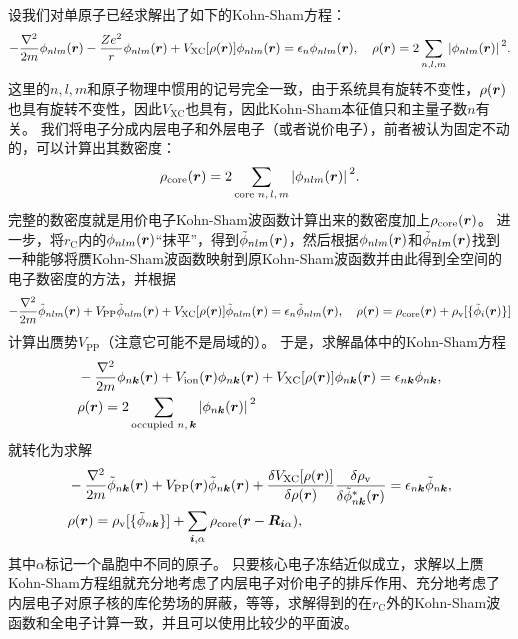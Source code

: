 设我们对单原子已经求解出了如下的Kohn-Sham方程：
\begin{equation}
    - \frac{\laplacian}{2m} \phi_{nlm}(\vb*{r}) - \frac{Z e^2}{r} \phi_{nlm}(\vb*{r}) + V_\text{XC}[\rho(\vb*{r})] \phi_{nlm}(\vb*{r}) = \epsilon_{n} \phi_{nlm}(\vb*{r}), \quad \rho(\vb*{r}) = 2 \sum_{n, l, m} \abs*{\phi_{nlm}(\vb*{r})}^2.
\end{equation}
这里的$n, l, m$和原子物理中惯用的记号完全一致，由于系统具有旋转不变性，$\rho(\vb*{r})$也具有旋转不变性，因此$V_\text{XC}$也具有，因此Kohn-Sham本征值只和主量子数$n$有关。
我们将电子分成内层电子和外层电子（或者说价电子），前者被认为固定不动的，可以计算出其数密度：
\begin{equation}
    \rho_\text{core}(\vb*{r}) = 2 \sum_{\text{core $n, l, m$}} \abs*{\phi_{nlm}(\vb*{r})}^2.
\end{equation}
完整的数密度就是用价电子Kohn-Sham波函数计算出来的数密度加上$\rho_\text{core}(\vb*{r})$。
进一步，将$r_\text{C}$内的$\phi_{nlm}(\vb*{r})$“抹平”，得到$\tilde{\phi}_{nlm}(\vb*{r})$，然后根据$\phi_{nlm}(\vb*{r})$和$\tilde{\phi}_{nlm}(\vb*{r})$找到一种能够将赝Kohn-Sham波函数映射到原Kohn-Sham波函数并由此得到全空间的电子数密度的方法，并根据
\begin{equation}
    - \frac{\laplacian}{2m} \tilde{\phi}_{nlm}(\vb*{r}) + V_\text{PP} \tilde{\phi}_{nlm}(\vb*{r}) + V_\text{XC}[\rho(\vb*{r})] \tilde{\phi}_{nlm}(\vb*{r}) = \epsilon_{n} \tilde{\phi}_{nlm}(\vb*{r}), \quad \rho(\vb*{r}) = \rho_\text{core}(\vb*{r}) + \rho_\text{v}[\{\tilde{\phi}_{i}(\vb*{r})\}]
\end{equation}
计算出赝势$V_\text{PP}$（注意它可能不是局域的）。
于是，求解晶体中的Kohn-Sham方程
\begin{equation}
    \begin{aligned}
        &- \frac{\laplacian}{2m} \phi_{n \vb*{k}}(\vb*{r}) + V_\text{ion}(\vb*{r}) \phi_{n \vb*{k}}(\vb*{r}) + V_\text{XC}[\rho(\vb*{r})] \phi_{n \vb*{k}}(\vb*{r}) = \epsilon_{n \vb*{k}} \phi_{n \vb*{k}}, \\
        &\rho(\vb*{r}) = 2 \sum_{\text{occupied $n, \vb*{k}$}} \abs*{\phi_{n \vb*{k}}(\vb*{r})}^2
    \end{aligned}
\end{equation}
就转化为求解
\begin{equation}
    \begin{aligned}
        &- \frac{\laplacian}{2m} \tilde{\phi}_{n \vb*{k}}(\vb*{r}) + V_\text{PP}(\vb*{r}) \tilde{\phi}_{n \vb*{k}}(\vb*{r}) + \fdv{V_\text{XC}[\rho(\vb*{r})]}{\rho(\vb*{r})} \fdv{\rho_\text{v}}{\tilde{\phi}^*_{n \vb*{k}}(\vb*{r})} = \epsilon_{n \vb*{k}} \tilde{\phi}_{n \vb*{k}}, \\
        &\rho(\vb*{r}) = \rho_\text{v}[\{\tilde{\phi}_{n \vb*{k}}\}] + \sum_{\vb*{i}, \alpha} \rho_\text{core}(\vb*{r} - \vb*{R}_{\vb*{i} \alpha}),
    \end{aligned}
\end{equation}
其中$\alpha$标记一个晶胞中不同的原子。
只要核心电子冻结近似成立，求解以上赝Kohn-Sham方程组就充分地考虑了内层电子对价电子的排斥作用、充分地考虑了内层电子对原子核的库伦势场的屏蔽，等等，求解得到的在$r_\text{C}$外的Kohn-Sham波函数和全电子计算一致，并且可以使用比较少的平面波。

